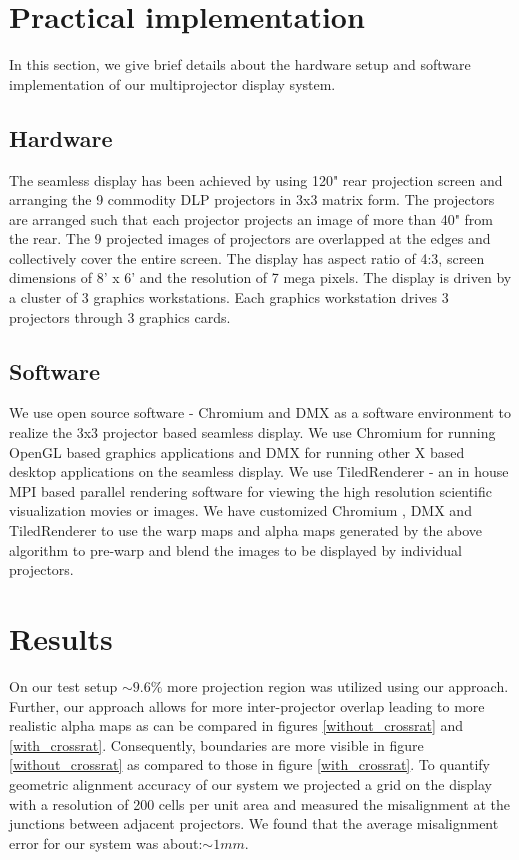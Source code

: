 \documentclass[letterpaper,10pt,conference]{/home/pranav/Desktop/Publication_work/latex_class_files/IEEEtran}
\begin{document}
\section{Practical implementation}
In this section, we give brief details about the hardware setup and software implementation of our multiprojector display system.

\subsection{Hardware}
The seamless display has been achieved by using 120" rear projection screen and arranging the 9 commodity DLP projectors in 3x3 matrix form. The projectors are arranged such that each projector projects an image of more than 40" from the rear. The 9 projected images of projectors are overlapped at the edges and collectively cover the entire screen. The display has aspect ratio of 4:3, screen dimensions of 8' x 6' and the resolution of 7 mega pixels. The display is driven by a cluster of 3 graphics workstations. Each 
graphics workstation drives 3 projectors through 3 graphics cards. 

\subsection{Software}
We use open source software - Chromium and DMX as a software environment to realize the 3x3 projector based seamless display. We use Chromium for running OpenGL based graphics applications and DMX for running other X based desktop applications on the seamless display. We use TiledRenderer\cite{pritam} - an in house MPI based parallel rendering software for viewing the high resolution scientific visualization movies or images. We have customized Chromium , DMX and TiledRenderer to use the warp maps and alpha maps generated by the above algorithm to pre-warp and blend the images to be displayed by individual projectors.


\section{Results}
On our test setup $\sim9.6\%$ more projection region was utilized using our approach. Further, our approach allows for more inter-projector overlap leading to more realistic alpha maps as can be compared in figures \ref{without_crossrat} and \ref{with_crossrat}. Consequently, boundaries are more visible in figure \ref{without_crossrat} as compared to those in figure \ref{with_crossrat}. To quantify geometric alignment accuracy of our system we projected a grid on the display with a resolution of 200 cells per unit area and measured the misalignment at the junctions between adjacent projectors. We found that the average misalignment error for our system was about:$\sim1mm$. 
\end{document}
